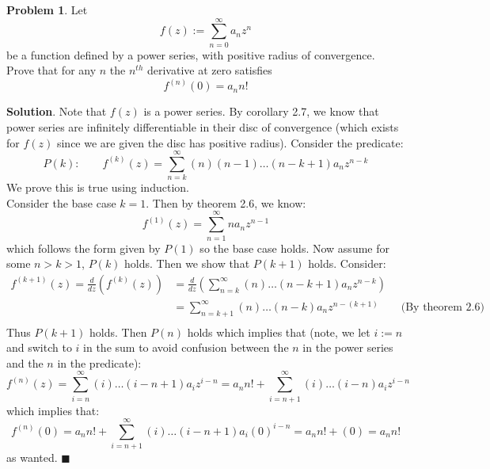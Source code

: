 \documentclass[12pt]{article}
\renewcommand{\=}[1]{\stackrel{#1}{=}} %
\theoremstyle{definition}
\newtheorem{p}{Problem}[section]
\theoremstyle{definition}
\newenvironment{s}{%
        \begin{trivlist} \item \textbf{Solution}. }{%
            \hspace*{\fill} $\blacksquare$\end{trivlist}}%
\begin{document}
\begin{p}
    Let
    \[ f(z) := \sum_{n=0}^{\infty} a_nz^n \]
    be a function defined by a power series, with positive radius of convergence. Prove that for any $n$ the $n^{th}$ derivative
    at zero satisfies
    \[ f^{(n)}(0) = a_nn! \]
\end{p}
\begin{s}
    Note that $f(z)$ is a power series. By corollary 2.7, we know that power series are infinitely differentiable in their
    disc of convergence (which exists for $f(z)$ since we are given the disc has positive radius).
    Consider the predicate:
    \[ P(k):\qquad f^{(k)}(z) = \sum_{n=k}^{\infty} (n)(n-1)\hdots(n-k+1)a_nz^{n-k}\]
    We prove this is true using induction. \\
    Consider the base case $k=1$. Then by theorem 2.6, we know:
    \[ f^{(1)}(z) = \sum_{n=1}^{\infty} na_nz^{n-1} \]
    which follows the form given by $P(1)$ so the base case holds. Now assume for some $n>k>1$, $P(k)$ holds. Then we show
    that $P(k+1)$ holds. Consider:
    \begin{align*}
        f^{(k+1)}(z) = \frac{d}{dz}(f^{(k)}(z)) &= \frac{d}{dz}(\sum_{n=k}^{\infty} (n)\hdots(n-k+1)a_nz^{n-k})  \\
        &= \sum_{n=k+1}^{\infty} (n)\hdots(n-k)a_nz^{n-(k+1)}\qquad\text{(By theorem 2.6)} \\
    \end{align*}
    Thus $P(k+1)$ holds. Then $P(n)$ holds which implies that (note, we let $i := n$ and switch to $i$ in the sum to avoid confusion between
    the $n$ in the power series and the $n$ in the predicate):
    \[ f^{(n)}(z) = \sum_{i=n}^{\infty} (i)\hdots(i-n+1)a_iz^{i-n} = a_nn! + \sum_{i=n+1}^{\infty} (i)\hdots(i-n)a_iz^{i-n} \]
    which implies that:
    \[ f^{(n)}(0) = a_nn! + \sum_{i=n+1}^{\infty} (i)\hdots(i-n+1)a_i(0)^{i-n} = a_nn! + (0) = a_nn!\]
    as wanted.
\end{s}
\end{document}
